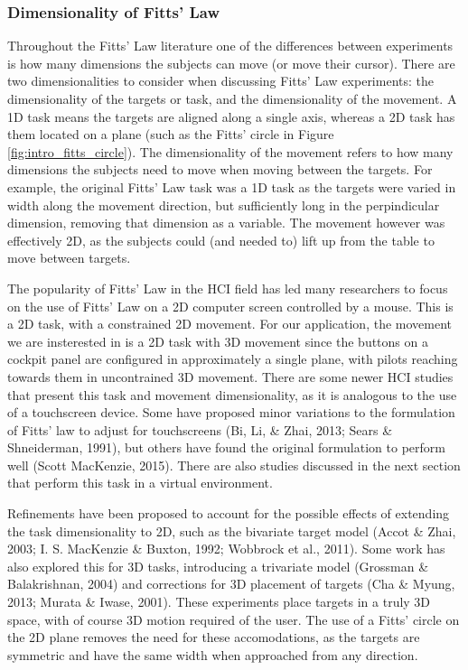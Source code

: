 \subsubsection{Dimensionality of Fitts' Law}\label{dimensionality-of-fitts-law}

Throughout the Fitts' Law literature one of the differences between experiments is how many dimensions the subjects can move (or move their cursor).
There are two dimensionalities to consider when discussing Fitts' Law experiments: the dimensionality of the targets or task, and the dimensionality of the movement.
A 1D task means the targets are aligned along a single axis, whereas a 2D task has them located on a plane (such as the Fitts' circle in Figure \ref{fig:intro_fitts_circle}).
The dimensionality of the movement refers to how many dimensions the subjects need to move when moving between the targets.
For example, the original Fitts' Law task was a 1D task as the targets were varied in width along the movement direction, but sufficiently long in the perpindicular dimension, removing that dimension as a variable.
The movement however was effectively 2D, as the subjects could (and needed to) lift up from the table to move between targets.

The popularity of Fitts' Law in the HCI field has led many researchers to focus on the use of Fitts' Law on a 2D computer screen controlled by a mouse.
This is a 2D task, with a constrained 2D movement.
For our application, the movement we are insterested in is a 2D task with 3D movement since the buttons on a cockpit panel are configured in approximately a single plane, with pilots reaching towards them in uncontrained 3D movement.
There are some newer HCI studies that present this task and movement dimensionality, as it is analogous to the use of a touchscreen device.
Some have proposed minor variations to the formulation of Fitts' law to adjust for touchscreens (Bi, Li, \& Zhai, 2013; Sears \& Shneiderman, 1991), but others have found the original formulation to perform well (Scott MacKenzie, 2015).
There are also studies discussed in the next section that perform this task in a virtual environment.

Refinements have been proposed to account for the possible effects of extending the task dimensionality to 2D, such as the bivariate target model (Accot \& Zhai, 2003; I.
S.
MacKenzie \& Buxton, 1992; Wobbrock et al., 2011).
Some work has also explored this for 3D tasks, introducing a trivariate model (Grossman \& Balakrishnan, 2004) and corrections for 3D placement of targets (Cha \& Myung, 2013; Murata \& Iwase, 2001).
These experiments place targets in a truly 3D space, with of course 3D motion required of the user.
The use of a Fitts' circle on the 2D plane removes the need for these accomodations, as the targets are symmetric and have the same width when approached from any direction.

